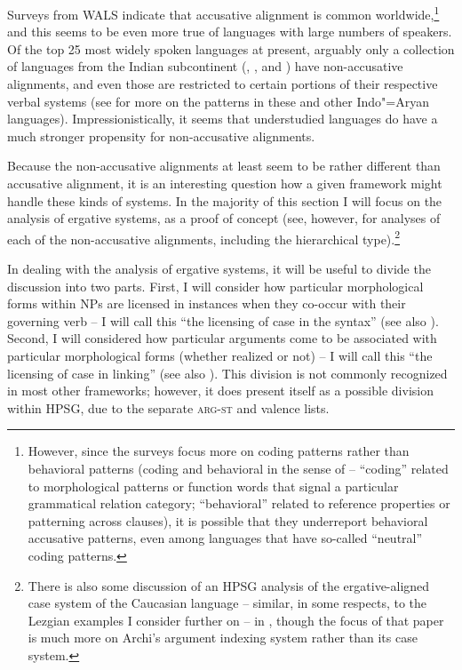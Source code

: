 \documentclass[output=paper
                ,modfonts
                ,nonflat
	        ,collection
	        ,collectionchapter
	        ,collectiontoclongg
 	        ,biblatex
                ,babelshorthands
                ,newtxmath
                ,draftmode
                ,colorlinks, citecolor=brown
]{./langsci/langscibook}
\begin{document}
{Surveys from WALS \citep{comrieWALSalignfullNP,comrieWALSalignpro,siewierskaWALSalignvp} indicate that accusative alignment is common worldwide,\footnote{However, since the surveys focus more on coding patterns  rather than behavioral patterns  (coding and behavioral in the sense of \citealt{keenan76subjects} -- ``coding'' related to morphological patterns or function words that signal a particular grammatical relation category; ``behavioral'' related to reference properties or patterning across clauses), it is possible that they underreport behavioral accusative patterns, even among languages that have so-called ``neutral'' coding patterns.} and this seems to be even more true of languages with large numbers of speakers. Of the top 25 most widely spoken languages at present, arguably only a collection of languages from the Indian subcontinent (, , and ) have non-accusative alignments, and even those are restricted to certain portions of their respective verbal systems (see \citealt[Chapter 7]{verbeke13} for more on the patterns in these and other Indo"=Aryan languages). Impressionistically, it seems that understudied languages do have a much stronger propensity for non-accusative alignments. 

Because the non-accusative alignments at least seem to be rather different than accusative alignment, it is an interesting question how a given framework might handle these kinds of systems. In the majority of this section I will focus on the analysis of ergative systems, as a proof of concept (see, however, \citealt{Drellishak2009a-u} for analyses of each of the non-accusative alignments, including the hierarchical type).\footnote{There is also some discussion of an HPSG analysis of the ergative-aligned case system of the Caucasian language  -- similar, in some respects, to the Lezgian examples I consider further on -- in \citet{borsley16}, though the focus of that paper is much more on Archi's argument indexing system rather than its case system.}

In dealing with the analysis of ergative systems, it will be useful to divide the discussion into two parts. First, I will consider how particular morphological forms within NPs are licensed in instances when they co-occur with their governing verb -- I will call this ``the licensing of case in the syntax'' (see also ). Second, I will considered how particular arguments come to be associated with particular morphological forms (whether realized or not) -- I will call this ``the licensing of case in linking''  (see also ). This division is not commonly recognized in most other frameworks; however, it does present itself as a possible division within HPSG, due to the separate \textsc{arg-st} and valence lists. 

}
\end{document}
